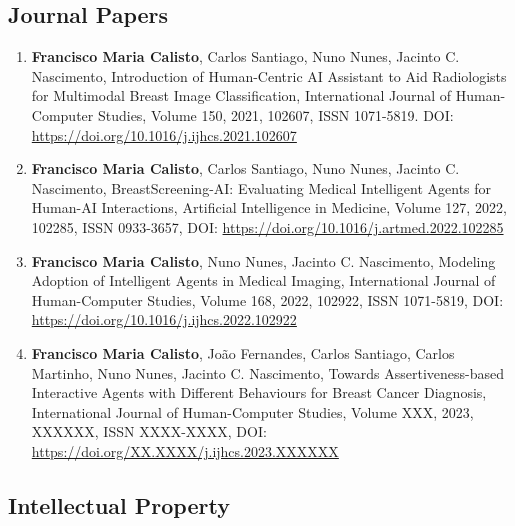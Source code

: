 \subsection{Journal Papers}
\label{sec:chap00100602}

\begin{enumerate}
\item {\bf Francisco Maria Calisto}, Carlos Santiago, Nuno Nunes, Jacinto C. Nascimento, Introduction of Human-Centric AI Assistant to Aid Radiologists for Multimodal Breast Image Classification, International Journal of Human-Computer Studies, Volume 150, 2021, 102607, ISSN 1071-5819. DOI: \href{https://doi.org/10.1016/j.ijhcs.2021.102607}{https://doi.org/10.1016/j.ijhcs.2021.102607}
\item {\bf Francisco Maria Calisto}, Carlos Santiago, Nuno Nunes, Jacinto C. Nascimento, BreastScreening-AI: Evaluating Medical Intelligent Agents for Human-AI Interactions, Artificial Intelligence in Medicine, Volume 127, 2022, 102285, ISSN 0933-3657, DOI: \href{https://doi.org/10.1016/j.artmed.2022.102285}{https://doi.org/10.1016/j.artmed.2022.102285}
\item {\bf Francisco Maria Calisto}, Nuno Nunes, Jacinto C. Nascimento, Modeling Adoption of Intelligent Agents in Medical Imaging, International Journal of Human-Computer Studies, Volume 168, 2022, 102922, ISSN 1071-5819, DOI: \href{https://doi.org/10.1016/j.ijhcs.2022.102922}{https://doi.org/10.1016/j.ijhcs.2022.102922}
\item {\bf Francisco Maria Calisto}, Jo\~{a}o Fernandes, Carlos Santiago, Carlos Martinho, Nuno Nunes, Jacinto C. Nascimento, Towards Assertiveness-based Interactive Agents with Different Behaviours for Breast Cancer Diagnosis, International Journal of Human-Computer Studies, Volume XXX, 2023, XXXXXX, ISSN XXXX-XXXX, DOI: \href{https://doi.org/XX.XXXX/j.ijhcs.2023.XXXXXX}{https://doi.org/XX.XXXX/j.ijhcs.2023.XXXXXX}
\end{enumerate}

\subsection{Intellectual Property}
\label{sec:chap00100603}


